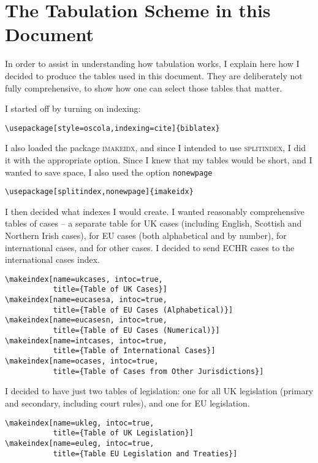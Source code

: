 \documentclass[a5paper,fontsize=9pt,DIV=1]{scrartcl}
\begin{document}
\section{The Tabulation Scheme in this Document}

In order to assist in understanding how tabulation works, I explain here how I decided to produce the tables used in this document. They are deliberately not fully comprehensive, to show how one can select those tables that matter.

I started off by turning on indexing:

\begin{verbatim}
\usepackage[style=oscola,indexing=cite]{biblatex}
\end{verbatim}

I also loaded the package \textsc{imakeidx}, and since I intended to use \textsc{splitindex}, I did it with the appropriate option. Since I knew that my tables would be short, and I wanted to save space, I also used the option \verb|nonewpage|

\begin{verbatim}
\usepackage[splitindex,nonewpage]{imakeidx}
\end{verbatim}

I then decided what indexes I would create. I wanted reasonably comprehensive tables of cases -- a separate table for UK cases (including English, Scottish and Northern Irish cases), for EU cases (both alphabetical and by number), for international cases, and for other cases. I decided to send ECHR cases to the international cases index.

\begin{verbatim}
\makeindex[name=ukcases, intoc=true,
           title={Table of UK Cases}]
\makeindex[name=eucasesa, intoc=true,
           title={Table of EU Cases (Alphabetical)}]
\makeindex[name=eucasesn, intoc=true,
           title={Table of EU Cases (Numerical)}]
\makeindex[name=intcases, intoc=true,
           title={Table of International Cases}]
\makeindex[name=ocases, intoc=true,
           title={Table of Cases from Other Jurisdictions}]
\end{verbatim}

I decided to have just two tables of legislation: one for all UK legislation (primary and secondary, including court rules), and one for EU legislation.

\begin{verbatim}
\makeindex[name=ukleg, intoc=true,
           title={Table of UK Legislation}]
\makeindex[name=euleg, intoc=true,
           title={Table EU Legislation and Treaties}]
\end{verbatim}
\end{document}
